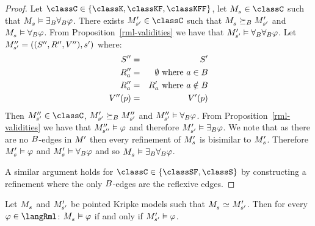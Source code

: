 \begin{proof}
Let $\classC \in \{\classK, \classKF, \classKFF\}$, let $\kPModel{\kStateS} \in \classC$ such that $\kPModel{\kStateS} \entails \somerefsBs \allrefsBs \phi$.
There exists $\kPModelP{\kStateSP} \in \classC$ such that $\kPModel{\kStateS} \simulatesBs \kPModelP{\kStateSP}$ and $\kPModel{\kStateS} \entails \allrefsBs \phi$.
From Proposition~\ref{rml-validities} we have that ${M^{\prime}_{{s}^{\prime}}} \vDash {\forall_{B}} {\forall_{B}} \varphi$.
Let $\kPModelAndTuplePP{\kStateSP}$ where:
\begin{eqnarray*}
    {S^{\prime\prime}} &=& {S^{\prime}}\\
    {R^{\prime\prime}_{a}} &=& \emptyset \text{ where } a \in B\\
    {R^{\prime\prime}_{a}} &=& {R^{\prime}_{a}} \text{ where } a \notin B\\
    {V^{\prime\prime}}(p) &=& {V^{\prime}}(p)
\end{eqnarray*}
Then $\kPModelPP{\kStateSP} \in \classC$, ${M^{\prime}_{{s}^{\prime}}} \succeq_{B} {M^{\prime\prime}_{{s}^{\prime}}}$ and ${M^{\prime\prime}_{{s}^{\prime}}} \vDash {\forall_{B}} \varphi$.
From Proposition~\ref{rml-validities} we have that ${M^{\prime\prime}_{{s}^{\prime\prime}}} \vDash \varphi$ and therefore ${M^{\prime}_{{s}^{\prime}}} \vDash {\exists_{B}} \varphi$.
We note that as there are no $B$-edges in ${M^{\prime}_{}}$ then every refinement of $\kPModelP{\kStateS}$ is bisimilar to $\kPModelP{\kStateS}$.
Therefore $\kPModelP{\kStateS} \entails \phi$ and $\kPModelP{\kStateS} \entails \allrefsBs \phi$ and so $\kPModel{\kStateS} \entails \somerefsBs \allrefsBs \phi$.

A similar argument holds for $\classC \in \{\classSF, \classS\}$ by constructing a refinement where the only $B$-edges are the reflexive edges.
\end{proof}


\begin{proposition}\label{rml-bisimulation-invariance}
Let $\kPModel{\kStateS}$ and ${M^{\prime}_{{s}^{\prime}}}$ be pointed Kripke models such that $\kPModel{\kStateS} \bisimilar \kPModelP{\kStateSP}$.
Then for every $\phi \in \langRml$:
$\kPModel{\kStateS} \entails \phi$ if and only if ${M^{\prime}_{{s}^{\prime}}} \vDash \varphi$.
\end{proposition}

